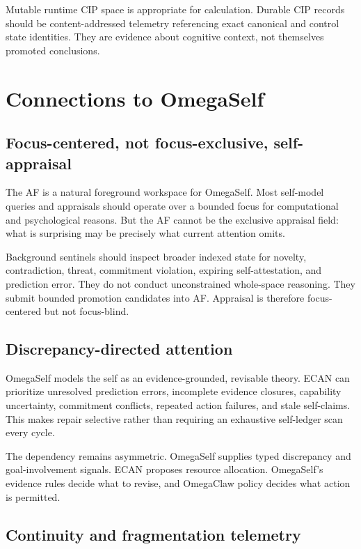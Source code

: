 \documentclass[11pt]{article}
\begin{document}
Mutable runtime CIP space is appropriate for calculation.  Durable CIP records
should be content-addressed telemetry referencing exact canonical and control
state identities.  They are evidence about cognitive context, not themselves
promoted conclusions.

\section{Connections to OmegaSelf}

\subsection{Focus-centered, not focus-exclusive, self-appraisal}

The AF is a natural foreground workspace for OmegaSelf.  Most self-model
queries and appraisals should operate over a bounded focus for computational and
psychological reasons.  But the AF cannot be the exclusive appraisal field:
what is surprising may be precisely what current attention omits.

Background sentinels should inspect broader indexed state for novelty,
contradiction, threat, commitment violation, expiring self-attestation, and
prediction error.  They do not conduct unconstrained whole-space reasoning.
They submit bounded promotion candidates into AF.  Appraisal is therefore
focus-centered but not focus-blind.

\subsection{Discrepancy-directed attention}

OmegaSelf models the self as an evidence-grounded, revisable theory.  ECAN can
prioritize unresolved prediction errors, incomplete evidence closures,
capability uncertainty, commitment conflicts, repeated action failures, and
stale self-claims.  This makes repair selective rather than requiring an
exhaustive self-ledger scan every cycle.

The dependency remains asymmetric.  OmegaSelf supplies typed discrepancy and
goal-involvement signals.  ECAN proposes resource allocation.  OmegaSelf's
evidence rules decide what to revise, and OmegaClaw policy decides what action
is permitted.

\subsection{Continuity and fragmentation telemetry}
\end{document}
